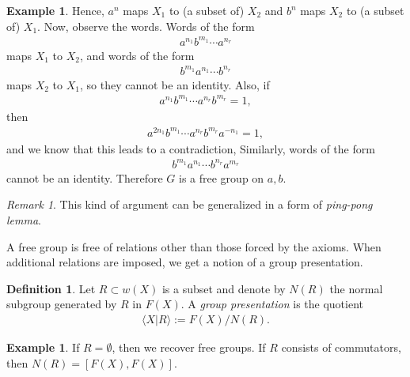 \documentclass[12pt]{report}
\theoremstyle{plain}
\theoremstyle{remark}
\newtheorem*{remark}{Remark}
\theoremstyle{definition}
\newtheorem{definition}[theorem]{Definition}
\newtheorem{example}[theorem]{Example}
\begin{document}
\begin{example}
    Hence, $a^n$ maps $X_1$ to (a subset of) $X_2$ and $b^n$ maps $X_2$ to (a subset of) $X_1$. Now, observe the words. Words of the form
    \begin{align*}
        a^{n_1}b^{m_1}\cdots a^{n_r}
    \end{align*}
    maps $X_1$ to $X_2$, and words of the form
    \begin{align*}
        b^{m_1}a^{n_1}\cdots b^{n_r}
    \end{align*}
    maps $X_2$ to $X_1$, so they cannot be an identity. Also, if
    \begin{align*}
        a^{n_1}b^{m_1}\cdots a^{n_r}b^{m_r}=1,
    \end{align*}
    then
    \begin{align*}
        a^{2n_1}b^{m_1}\cdots a^{n_r}b^{m_r}a^{-n_1}=1,
    \end{align*}
    and we know that this leads to a contradiction, Similarly, words of the form
    \begin{align*}
        b^{m_1}a^{n_1}\cdots b^{n_r}a^{m_r}
    \end{align*}
    cannot be an identity. Therefore $G$ is a free group on $a,b$.
\end{example}
\begin{remark}
    This kind of argument can be generalized in a form of \emph{ping-pong lemma}.
\end{remark}

A free group is free of relations other than those forced by the axioms. When additional relations are imposed, we get a notion of a group presentation.

\begin{definition}
    Let $R\subset w(X)$ is a subset and denote by $N(R)$ the normal subgroup generated by $R$ in $F(X)$. A \emph{group presentation} is the quotient
    \begin{align*}
        \langle X|R\rangle := F(X)/N(R).
    \end{align*}
\end{definition}

\begin{example}
    If $R=\emptyset$, then we recover free groups. If $R$ consists of commutators, then $N(R)=[F(X),F(X)]$.
\end{example}
\end{document}
